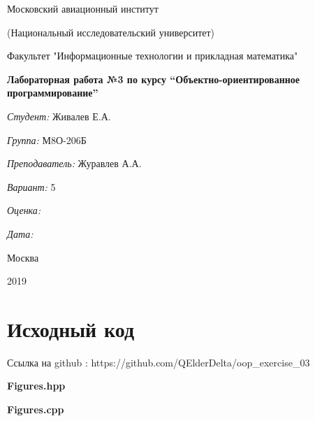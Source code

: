 \documentclass[a4paper, 12pt]{article}
\begin{document}
\thispagestyle{empty}	
\begin{center}
	Московский авиационный институт
	
	(Национальный исследовательский университет)
	
	Факультет "Информационные технологии и прикладная математика"
	
\end{center}
\vspace{40ex}
\begin{center}
	\textbf{\large{Лабораторная работа №3 по курсу \textquotedblleft Объектно-ориентированное программирование\textquotedblright}}
\end{center}
\vspace{40ex}
\begin{flushright}
	\textit{Студент: } Живалев Е.А.
	
	\vspace{2ex}
	\textit{Группа: } М8О-206Б
	
	\vspace{2ex}
	\textit{Преподаватель: } Журавлев А.А.
	
	\vspace{2ex}
	\textit{Вариант: } 5
	
	\vspace{2ex}
	\textit{Оценка: } \underline{\quad\quad\quad\quad\quad\quad}
	
	 \vspace{2ex}
	\textit{Дата: } \underline{\quad\quad\quad\quad\quad\quad}
	
\end{flushright}

\begin{vfill}
	\begin{center}
		Москва
		
		2019
	\end{center}	
\end{vfill}
\newpage
\section{Исходный код}

Ссылка на github : https://github.com/QElderDelta/oop\_exercise\_03

\vspace{3ex}
\textbf{\large{Figures.hpp}}


\vspace{3ex}
\textbf{\large{Figures.cpp}}

\end{document}
